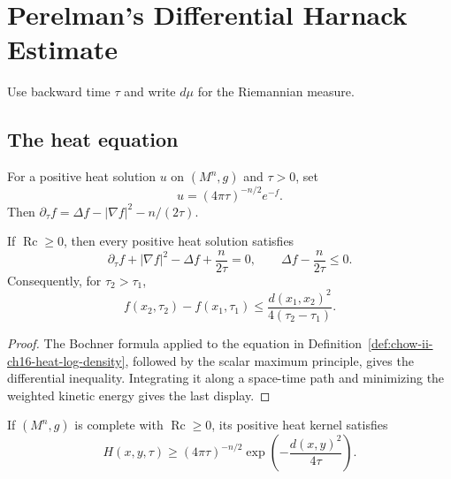 \chapter[16]{Perelman's Differential Harnack Estimate}
\label{ch:chow-ii-perelman-differential-harnack}

Use backward time \(\tau\) and write \(d\mu\) for the Riemannian measure.

\section{The heat equation}

\begin{definition}
\label{def:chow-ii-ch16-heat-log-density}

For a positive heat solution $u$ on $(M^n,g)$ and $\tau>0$, set
\[
u=(4\pi\tau)^{-n/2}e^{-f}.
\]
Then $\partial_\tau f=\Delta f-|\nabla f|^2-n/(2\tau)$.
\end{definition}

\begin{theorem}
\label{thm:chow-ii-ch16-li-yau}


If $\operatorname{Rc}\ge0$, then every positive heat solution satisfies
\[
\partial_\tau f+|\nabla f|^2-\Delta f+\frac{n}{2\tau}=0,
\qquad \Delta f-\frac{n}{2\tau}\le0.
\]
Consequently, for $\tau_2>\tau_1$,
\[
f(x_2,\tau_2)-f(x_1,\tau_1)\le
 \frac{d(x_1,x_2)^2}{4(\tau_2-\tau_1)}.
\]
\end{theorem}
\begin{proof}
\sketch The Bochner formula applied to the equation in
Definition~\ref{def:chow-ii-ch16-heat-log-density}, followed by the scalar
maximum principle, gives the differential inequality. Integrating it along a
space-time path and minimizing the weighted kinetic energy gives the last
display.
\end{proof}

\begin{theorem}
\label{thm:chow-ii-ch16-cheeger-yau}

If $(M^n,g)$ is complete with $\operatorname{Rc}\ge0$, its positive heat kernel
satisfies
\[
H(x,y,\tau)\ge(4\pi\tau)^{-n/2}
 \exp\!\left(-\frac{d(x,y)^2}{4\tau}\right).
\]
\end{theorem}

